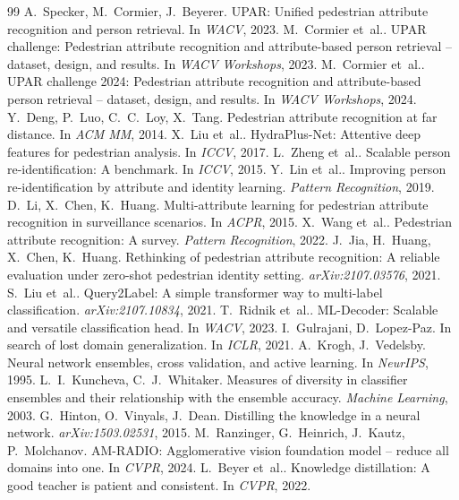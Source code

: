 \documentclass[10pt,twocolumn,letterpaper]{article}
\newcommand{\etal}{et~al.}
\begin{document}
{\small
\begin{thebibliography}{99}\setlength{\itemsep}{0pt}
 A.~Specker, M.~Cormier, J.~Beyerer. UPAR: Unified pedestrian attribute recognition and person retrieval. In \textit{WACV}, 2023.
 M.~Cormier \etal. UPAR challenge: Pedestrian attribute recognition and attribute-based person retrieval -- dataset, design, and results. In \textit{WACV Workshops}, 2023.
 M.~Cormier \etal. UPAR challenge 2024: Pedestrian attribute recognition and attribute-based person retrieval -- dataset, design, and results. In \textit{WACV Workshops}, 2024.
 Y.~Deng, P.~Luo, C.~C.~Loy, X.~Tang. Pedestrian attribute recognition at far distance. In \textit{ACM MM}, 2014.
 X.~Liu \etal. HydraPlus-Net: Attentive deep features for pedestrian analysis. In \textit{ICCV}, 2017.
 L.~Zheng \etal. Scalable person re-identification: A benchmark. In \textit{ICCV}, 2015.
 Y.~Lin \etal. Improving person re-identification by attribute and identity learning. \textit{Pattern Recognition}, 2019.
 D.~Li, X.~Chen, K.~Huang. Multi-attribute learning for pedestrian attribute recognition in surveillance scenarios. In \textit{ACPR}, 2015.
 X.~Wang \etal. Pedestrian attribute recognition: A survey. \textit{Pattern Recognition}, 2022.
 J.~Jia, H.~Huang, X.~Chen, K.~Huang. Rethinking of pedestrian attribute recognition: A reliable evaluation under zero-shot pedestrian identity setting. \textit{arXiv:2107.03576}, 2021.
 S.~Liu \etal. Query2Label: A simple transformer way to multi-label classification. \textit{arXiv:2107.10834}, 2021.
 T.~Ridnik \etal. ML-Decoder: Scalable and versatile classification head. In \textit{WACV}, 2023.
 I.~Gulrajani, D.~Lopez-Paz. In search of lost domain generalization. In \textit{ICLR}, 2021.
 A.~Krogh, J.~Vedelsby. Neural network ensembles, cross validation, and active learning. In \textit{NeurIPS}, 1995.
 L.~I.~Kuncheva, C.~J.~Whitaker. Measures of diversity in classifier ensembles and their relationship with the ensemble accuracy. \textit{Machine Learning}, 2003.
 G.~Hinton, O.~Vinyals, J.~Dean. Distilling the knowledge in a neural network. \textit{arXiv:1503.02531}, 2015.
 M.~Ranzinger, G.~Heinrich, J.~Kautz, P.~Molchanov. AM-RADIO: Agglomerative vision foundation model -- reduce all domains into one. In \textit{CVPR}, 2024.
 L.~Beyer \etal. Knowledge distillation: A good teacher is patient and consistent. In \textit{CVPR}, 2022.

\end{thebibliography}}
\end{document}
